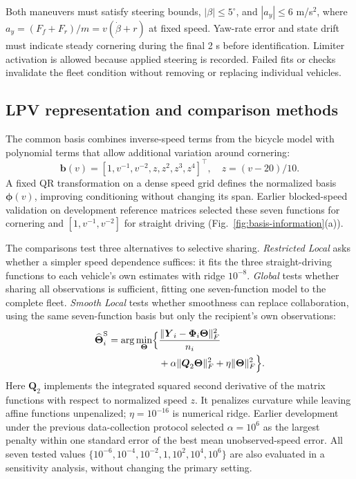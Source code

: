 \documentclass[conference]{IEEEtran}
\newcommand{\rev}[1]{\textcolor{revisiongreen}{#1}}
\newcommand{\revred}[1]{\textcolor{revisionred}{#1}}
\newcommand{\focusrev}[1]{\textcolor{focusedrevision}{#1}}
\newcommand{\bs}[1]{\boldsymbol{#1}}
\newcommand{\method}[1]{\textit{#1}}
\newcommand{\RestrictedLocal}{\method{Restricted Local}}
\newcommand{\SmoothLocal}{\method{Smooth Local}}
\newcommand{\GlobalModel}{\method{Global}}
\begin{document}
\revred{Both maneuvers must satisfy steering bounds, $|\beta|\leq5^\circ$, and
$|a_y|\leq6$ m/s$^2$, where $a_y=(F_f+F_r)/m=v(\dot\beta+r)$ at fixed speed.
Yaw-rate error and state drift must indicate steady cornering during the final
2 s before identification. Limiter activation is allowed because applied steering
is recorded. Failed fits or checks invalidate the fleet condition without removing
or replacing individual vehicles.}

\subsection{LPV representation and comparison methods}
\label{sec:baselines}
The common basis \rev{combines inverse-speed terms from the bicycle model with
polynomial terms that allow additional variation around cornering}:
\begin{equation}
 \bs{b}(v)=[1,v^{-1},v^{-2},z,z^2,z^3,z^4]^\top,
 \quad z=(v-20)/10.
 \label{eq:basis}
\end{equation}
\rev{A fixed QR transformation} on \rev{a dense speed grid defines the normalized
basis $\bs{\phi}(v)$, improving} conditioning without changing \rev{its} span.
Earlier blocked-speed validation \rev{on development} reference matrices selected
\rev{these seven functions} for cornering and $[1,v^{-1},v^{-2}]$ for straight
driving (Fig.~\ref{fig:basis-information}(a)).

\rev{The comparisons test three alternatives to selective sharing}.
\RestrictedLocal{} \rev{asks whether} a \rev{simpler speed dependence suffices:
it fits} the three straight-driving functions to each \rev{vehicle's own estimates}
with ridge $10^{-8}$. \GlobalModel{} \rev{tests whether sharing} all \rev{observations
is sufficient, fitting one seven-function model to the complete fleet}.
\SmoothLocal{} tests whether smoothness \rev{can replace collaboration},
using the \rev{same seven-function basis but only the recipient's own observations}:
\begingroup\color{revisiongreen}
\begin{equation}
 \begin{aligned}
 \widehat{\bs{\Theta}}_i^{\rm S}=\arg\min_{\bs{\Theta}}\Bigl\{&
 \frac{\|\bs{Y}_i-\bs{\Phi}_i\bs{\Theta}\|_F^2}{n_i}\\
 &+\alpha\|\bs{Q}_2\bs{\Theta}\|_F^2+
 \eta\|\bs{\Theta}\|_F^2\Bigr\}.
 \end{aligned}
 \label{eq:smooth-local}
\end{equation}
\endgroup
Here \rev{$\bs{Q}_2$ implements} the \rev{integrated squared second derivative} of
\rev{the matrix functions with respect to normalized speed $z$.
It penalizes curvature while leaving affine functions unpenalized};
$\eta=10^{-16}$ is numerical ridge. \focusrev{Earlier development under the
previous data-collection protocol selected $\alpha=10^6$ as} the largest penalty within one standard error of the best
mean \rev{unobserved-speed error. All seven tested values
$\{10^{-6},10^{-4},10^{-2},1,10^2,10^4,10^6\}$ are also evaluated in a
sensitivity analysis, without changing the primary setting}.
\end{document}
